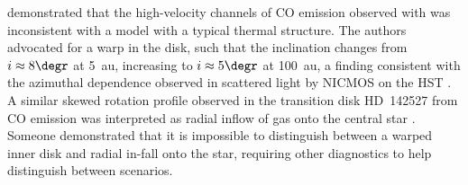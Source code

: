 \documentclass[11pt]{article}
\begin{document}
\citet{2015ApJ...807....2C} demonstrated that the high-velocity channels of CO
emission observed with \citep{Cleeves_ea_2015a} was inconsistent with a model
with a typical thermal structure. The authors advocated for a warp in the disk,
such that the inclination changes from $i \approx 8\degr$ at 5~au, increasing
to $i \approx 5\degr$ at 100~au, a finding consistent with the azimuthal
dependence observed in scattered light by NICMOS on the \gls{HST}
\citep{2015ApJ...799..204C}. A similar skewed rotation profile observed in the
transition disk HD~142527 from CO emission was interpreted as radial inflow of
gas onto the central star \citep{1994A&A...291..943O, Cleeves_ea_2015a,
2015ApJ...799..204C}. Someone demonstrated that it is impossible to distinguish
between a warped inner disk and radial in-fall onto the star, requiring other
diagnostics to help distinguish between scenarios.


\end{document}

